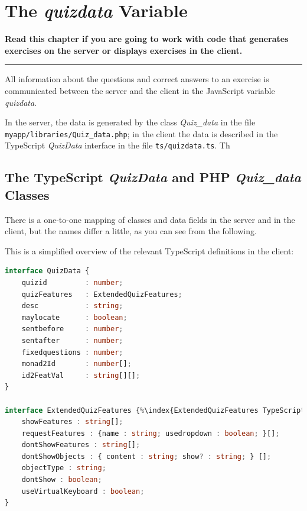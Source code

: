 \documentclass[11pt,oneside,a4paper]{memoir}
\begin{document}
\chapter{The \emph{quizdata} Variable}\label{chap-quizdata}%

\textbf{Read this chapter if you are going to work with code that generates exercises on
  the server or displays exercises in the client.} 
\plainbreak{3}

All information about the questions and correct answers to an exercise is communicated between the
server and the client in the JavaScript variable \emph{quizdata}.

In the server, the data is generated by the class \emph{Quiz\_data} in the file
\texttt{myapp/\allowbreak{}libraries/\allowbreak{}Quiz\_data.php}; in the client the data is described in the TypeScript
\emph{QuizData} interface in the file \texttt{ts/quizdata.ts}. Th



\section{The TypeScript \emph{QuizData} and PHP \emph{Quiz\_data} Classes}%
%

There is a one-to-one mapping of classes and data fields in the server and in the client, but the
names differ a little, as you can see from the following.

This is a simplified overview of the relevant TypeScript definitions in the client:

\begin{lstlisting}[language=TypeScript]
interface QuizData {
    quizid         : number;
    quizFeatures   : ExtendedQuizFeatures;
    desc           : string;
    maylocate      : boolean;
    sentbefore     : number;
    sentafter      : number;
    fixedquestions : number;
    monad2Id       : number[];
    id2FeatVal     : string[][];
}

interface ExtendedQuizFeatures {%\index{ExtendedQuizFeatures TypeScript interface@\emph{ExtendedQuizFeatures} TypeScript interface}%
    showFeatures : string[];
    requestFeatures : {name : string; usedropdown : boolean; }[];
    dontShowFeatures : string[];
    dontShowObjects : { content : string; show? : string; } [];
    objectType : string;
    dontShow : boolean;
    useVirtualKeyboard : boolean;
}
\end{lstlisting}
\end{document}
